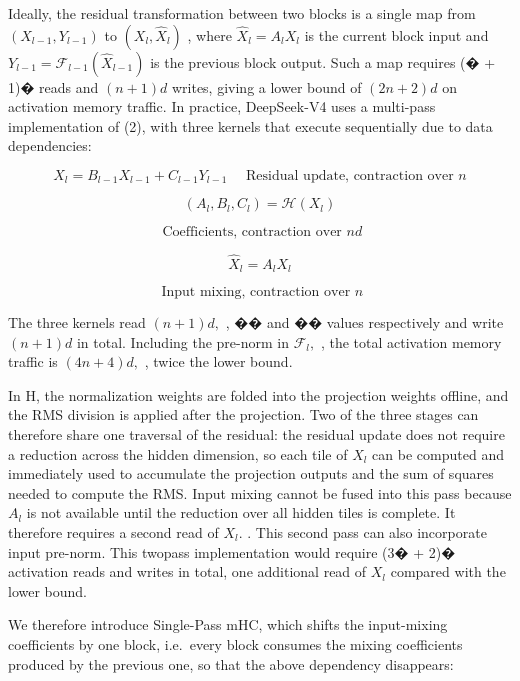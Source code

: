 \documentclass[
  10
]{article}
\begin{document}
Ideally, the residual transformation between two blocks is a single map
from \(\left( X _ { l - 1 } , Y _ { l - 1 } \right)\) to
\(( X _ { l } , \hat { X } _ { l } )\) , where
\(\hat { X } _ { l } = A _ { l } X _ { l }\) is the current block input
and
\(Y _ { l - 1 } = \mathcal { F } _ { l - 1 } ( \hat { X } _ { l - 1 } )\)
is the previous block output. Such a map requires (� + 1)� reads and
\(( n + 1 ) d\) writes, giving a lower bound of \(( 2 n + 2 ) d\) on
activation memory traffic. In practice, DeepSeek-V4 uses a multi-pass
implementation of (2), with three kernels that execute sequentially due
to data dependencies:

\[
X _ {l} = B _ {l - 1} X _ {l - 1} + C _ {l - 1} Y _ {l - 1} \quad \text {   Residual   update,   contraction   over   } n\tag{3}
\]

\[
(A _ {l}, B _ {l}, C _ {l}) = \mathcal {H} (X _ {l})
\]

\[
\text { Coefficients,   contraction   over } n d\tag{4}
\]

\[
\hat {X} _ {l} = A _ {l} X _ {l}
\]

\[
\text { Input   mixing,   contraction   over } n\tag{5}
\]

The three kernels read \(( n + 1 ) d ,\) , �� and �� values respectively
and write \(( n + 1 ) d\) in total. Including the pre-norm in
\(\mathcal { F } _ { l } ,\) , the total activation memory traffic is
\(( 4 n + 4 ) d ,\) , twice the lower bound.

In H, the normalization weights are folded into the projection weights
offline, and the RMS division is applied after the projection. Two of
the three stages can therefore share one traversal of the residual: the
residual update does not require a reduction across the hidden
dimension, so each tile of \(X _ { l }\) can be computed and immediately
used to accumulate the projection outputs and the sum of squares needed
to compute the RMS. Input mixing cannot be fused into this pass because
\(A _ { l }\) is not available until the reduction over all hidden tiles
is complete. It therefore requires a second read of \(X _ { l } .\) .
This second pass can also incorporate input pre-norm. This twopass
implementation would require (3� + 2)� activation reads and writes in
total, one additional read of \(X _ { l }\) compared with the lower
bound.

We therefore introduce Single-Pass mHC, which shifts the input-mixing
coefficients by one block, i.e.~every block consumes the mixing
coefficients produced by the previous one, so that the above dependency
disappears:
\end{document}
